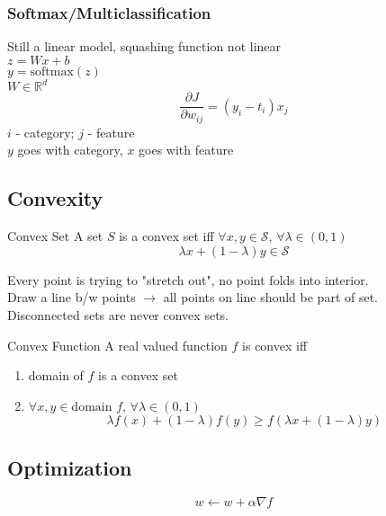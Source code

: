 \documentclass{article}
\begin{document}
\subsubsection{Softmax/Multiclassification}
Still a linear model, squashing function not linear\\
$z = Wx + b$
\\
$y=\mathrm{softmax}(z)$
\\
$W\in\mathbb R^d$
\[
    \frac{\partial J}{\partial w_{ij}} = (y_i-t_i)x_j
\]
$i$ - category; $j$ - feature
\\
$y$ goes with category, $x$ goes with feature


\subsection{Convexity}
\begin{definition}
    {Convex Set}{}
    A set $S$ is a convex set iff $\forall x,y\in \mathcal S$, $\forall \lambda \in (0,1)$
    \[
        \lambda x +(1-\lambda)y \in \mathcal S
    \]
    
    Every point is trying to "stretch out", no point folds into interior.\\
    Draw a line b/w points $\to$ all points on line should be part of set.\\
    Disconnected sets are never convex sets.
\end{definition}

\begin{definition}
    {Convex Function}{}
    A real valued function $f$ is convex iff
    \begin{enumerate}
        \item domain of $f$ is a convex set
        \item $\forall x,y \in \text{domain }f$, $\forall \lambda \in (0,1)$
        \[
            \lambda f(x) + (1-\lambda) f(y) \ge f(\lambda x + (1-\lambda)y)
        \]
    \end{enumerate}
\end{definition}


\subsection{Optimization}
\[
    w \gets w + \alpha \nabla f
\]
\end{document}
